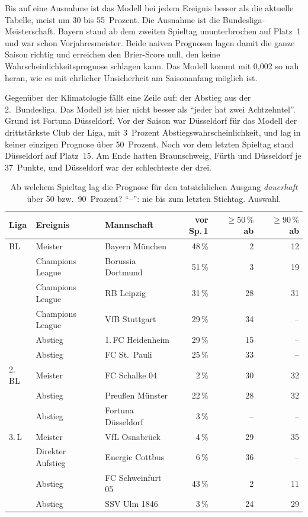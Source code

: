 \documentclass[11pt,a4paper,parskip=half,numbers=noenddot]{scrartcl}
\begin{document}
Bis auf eine Ausnahme ist das Modell bei jedem Ereignis besser als die
aktuelle Tabelle, meist um 30 bis 55~Prozent. Die Ausnahme ist die
Bundesliga-Meisterschaft. Bayern stand ab dem zweiten Spieltag
ununterbrochen auf Platz~1 und war schon Vorjahresmeister. Beide naiven
Prognosen lagen damit die ganze Saison richtig und erreichen den Brier-Score
null, den keine Wahrscheinlichkeitsprognose schlagen kann. Das Modell kommt
mit 0,002 so nah heran, wie es mit ehrlicher Unsicherheit am Saisonanfang
möglich ist.

Gegenüber der Klimatologie fällt eine Zeile auf: der Abstieg aus der
2.~Bundesliga. Das Modell ist hier nicht besser als \enquote{jeder hat zwei
Achtzehntel}. Grund ist Fortuna Düsseldorf. Vor der Saison war Düsseldorf
für das Modell der drittstärkste Club der Liga, mit 3~Prozent
Abstiegswahrscheinlichkeit, und lag in keiner einzigen Prognose über
50~Prozent. Noch vor dem letzten Spieltag stand Düsseldorf auf Platz~15.
Am Ende hatten Braunschweig, Fürth und Düsseldorf je 37~Punkte, und
Düsseldorf war der schlechteste der drei.

\begin{table}[!htbp]
\centering\small
\caption{Ab welchem Spieltag lag die Prognose für den tatsächlichen Ausgang
\emph{dauerhaft} über 50 bzw.\ 90~Prozent? \enquote{--}: nie bis zum
letzten Stichtag. Auswahl.}\label{tab:abwann}
\begin{tabular}{@{}lll rrr@{}}
\toprule
Liga & Ereignis & Mannschaft & vor Sp.\,1 & $\ge 50\,\%$ ab & $\ge 90\,\%$ ab \\
\midrule
BL & Meister & Bayern München & 48\,\% & 2 & 12 \\
   & Champions League & Borussia Dortmund & 51\,\% & 3 & 19 \\
   & Champions League & RB Leipzig & 31\,\% & 28 & 31 \\
   & Champions League & VfB Stuttgart & 29\,\% & 34 & -- \\
   & Abstieg & 1.\,FC Heidenheim & 29\,\% & 15 & -- \\
   & Abstieg & FC St.\ Pauli & 25\,\% & 33 & -- \\
2.\,BL & Meister & FC Schalke 04 & 2\,\% & 30 & 32 \\
   & Abstieg & Preußen Münster & 22\,\% & 28 & 32 \\
   & Abstieg & Fortuna Düsseldorf & 3\,\% & -- & -- \\
3.\,L & Meister & VfL Osnabrück & 4\,\% & 29 & 35 \\
   & Direkter Aufstieg & Energie Cottbus & 6\,\% & 36 & -- \\
   & Abstieg & FC Schweinfurt 05 & 43\,\% & 2 & 11 \\
   & Abstieg & SSV Ulm 1846 & 3\,\% & 24 & 29 \\
\bottomrule
\end{tabular}
\end{table}
\end{document}
